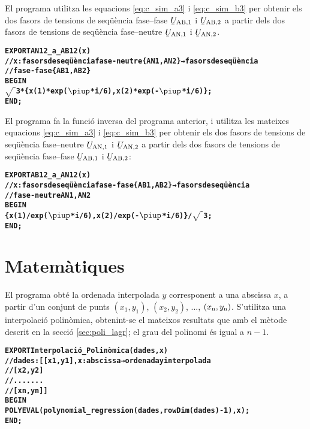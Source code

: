 El programa  utilitza les equacions  \eqref{eq:c_sim_a3} i \eqref{eq:c_sim_b3} per obtenir els dos fasors de tensions de seqüència fase--fase $\cmplx{U}\ped{AB,1}$ i  $\cmplx{U}\ped{AB,2}$ a partir dels dos fasors de tensions de seqüència fase--neutre $\cmplx{U}\ped{AN,1}$ i $\cmplx{U}\ped{AN,2}$.
\vspace{-6mm}
\begin{alltt}
\bfseries
{}
    EXPORT AN12_a_AB12(x)
    // x:fasors de seqüència fase-neutre \{AN1,AN2\} → fasors de seqüència
    // fase-fase \{AB1,AB2\}
    BEGIN
      \(\sqrt{\phantom{|}}\)3*\{x(1)*exp(\(\piup\)*i/6),x(2)*exp(-\(\piup\)*i/6)\};
    END;
\end{alltt}

El programa  fa la funció inversa del programa anterior, i utilitza les mateixes equacions  \eqref{eq:c_sim_a3} i \eqref{eq:c_sim_b3} per obtenir els dos fasors de tensions de seqüència fase--neutre $\cmplx{U}\ped{AN,1}$ i $\cmplx{U}\ped{AN,2}$ a partir dels dos fasors de tensions de seqüència fase--fase $\cmplx{U}\ped{AB,1}$ i  $\cmplx{U}\ped{AB,2}$:
\vspace{-6mm}
\begin{alltt}
\bfseries
{}
    EXPORT AB12_a_AN12(x)
    // x:fasors de seqüència fase-fase \{AB1,AB2\} → fasors de seqüència
    // fase-neutre {AN1,AN2}
    BEGIN
      \{x(1)/exp(\(\piup\)*i/6),x(2)/exp(-\(\piup\)*i/6)\}/\(\sqrt{\phantom{|}}\)3;
    END;
\end{alltt}


\section{Matemàtiques}

El programa  obté la ordenada interpolada $y$ corresponent a una abscissa $x$, a partir d'un conjunt  de punts $(x_1,y_1)$, $(x_2,y_2)$, ..., $(x_\mathrm{n},y_\mathrm{n})$. S'utilitza una interpolació polinòmica, obtenint-se el mateixos resultats que amb el mètode descrit en la secció \vref{sec:poli_lagr}; el grau del polinomi és igual a $n-1$.
\vspace{-6mm}
\begin{alltt}
\bfseries
{}
    EXPORT Interpolació_Polinòmica(dades,x)
    // dades:[[x1,y1], x:abscissa → ordenada y interpolada
    //        [x2,y2]
    //        .......
    //        [xn,yn]]
    BEGIN
      POLYEVAL(polynomial_regression(dades,rowDim(dades)-1),x);
    END;
\end{alltt}


